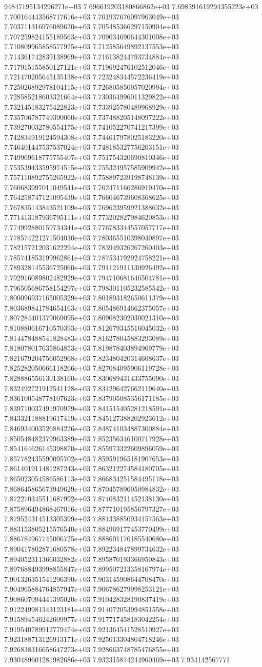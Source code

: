 94847195134296271e+03	7.696619203180866862e+03	7.698391619294355223e+03	7.700164443568717616e+03	7.701937676097963049e+03	7.703711316976089620e+03	7.705485366297150904e+03	7.707259824155189563e+03	7.709034690644301008e+03	7.710809965858577925e+03	7.712585649892137553e+03	7.714361742839138969e+03	7.716138244793734884e+03	7.717915155850127121e+03	7.719692476102512046e+03	7.721470205645135138e+03	7.723248344572236419e+03	7.725026892978104115e+03	7.726805850957020994e+03	7.728585218603321664e+03	7.730364996011329822e+03	7.732145183275422823e+03	7.733925780489968929e+03	7.735706787749390060e+03	7.737488205148097222e+03	7.739270032780554175e+03	7.741052270741217399e+03	7.742834919124594308e+03	7.744617978025183220e+03	7.746401447537537024e+03	7.748185327756203151e+03	7.749969618775755407e+03	7.751754320690810346e+03	7.753539433595974515e+03	7.755324957585909942e+03	7.757110892755265922e+03	7.758897239198748139e+03	7.760683997011049541e+03	7.762471166286919470e+03	7.764258747121095439e+03	7.766046739608368625e+03	7.767835143843521109e+03	7.769623959921388632e+03	7.771413187936795111e+03	7.773202827984620853e+03	7.774992880159734341e+03	7.776783344557057717e+03	7.778574221271504030e+03	7.780365510398040897e+03	7.782157212031622294e+03	7.783949326267260403e+03	7.785741853199962861e+03	7.787534792924758221e+03	7.789328145536725060e+03	7.791121911130926492e+03	7.792916089802482929e+03	7.794710681646504781e+03	7.796505686758154297e+03	7.798301105232585542e+03	7.800096937165005329e+03	7.801893182650611379e+03	7.803689841784654163e+03	7.805486914662375057e+03	7.807284401379069095e+03	7.809082302030021310e+03	7.810880616710570393e+03	7.812679345516045032e+03	7.814478488541828483e+03	7.816278045883293089e+03	7.818078017635864853e+03	7.819878403894969779e+03	7.821679204756052968e+03	7.823480420314608637e+03	7.825282050666118266e+03	7.827084095906119728e+03	7.828886556130138160e+03	7.830689431433755090e+03	7.832492721912541128e+03	7.834296427662119640e+03	7.836100548778107623e+03	7.837905085356171185e+03	7.839710037491970979e+03	7.841515405281218591e+03	7.843321188819617419e+03	7.845127388202923612e+03	7.846934003526884226e+03	7.848741034887300884e+03	7.850548482379963389e+03	7.852356346100717928e+03	7.854164626145398870e+03	7.855973322609896059e+03	7.857782435590095702e+03	7.859591965181907653e+03	7.861401911481287243e+03	7.863212274584180705e+03	7.865023054586586113e+03	7.866834251584495178e+03	7.868645865673949629e+03	7.870457896950984832e+03	7.872270345511687992e+03	7.874083211452138130e+03	7.875896494868467016e+03	7.877710195856797327e+03	7.879524314513305399e+03	7.881338850934157563e+03	7.883153805215576540e+03	7.884969177453770499e+03	7.886784967745006725e+03	7.888601176185540680e+03	7.890417802871680578e+03	7.892234847899734632e+03	7.894052311366032882e+03	7.895870193366950843e+03	7.897688493998855847e+03	7.899507213358167974e+03	7.901326351541296390e+03	7.903145908644708470e+03	7.904965884764857947e+03	7.906786279998253121e+03	7.908607094441395020e+03	7.910428328190837419e+03	7.912249981343123181e+03	7.914072053994851558e+03	7.915894546242609977e+03	7.917717458183042254e+03	7.919540789912779474e+03	7.921364541528510927e+03	7.923188713126913171e+03	7.925013304804718246e+03	7.926838316658647273e+03	7.928663748785476855e+03	7.930489601281982686e+03	7.932315874244960469e+03	7.934142567771